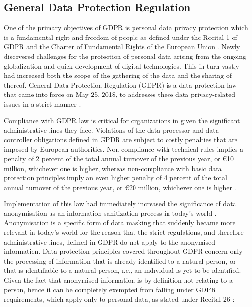 \documentclass[a4paper,twoside,12pt]{book}
\begin{document}
\subsection{General Data Protection Regulation}

One of the primary objectives of GDPR is personal data privacy protection which is a fundamental right and freedom of people as defined under the Recital 1 of GDPR \cite{bib:recital1} and the Charter of Fundamental Rights of the European Union \cite{bib:charter}. Newly discovered challenges for the protection of personal data arising from the ongoing globalization and quick development of digital technologies. This in turn vastly had increased both the scope of the gathering of the data and the sharing of thereof. General Data Protection Regulation (GDPR) is a data protection law that came into force on May 25, 2018, to addresses these data privacy-related issues in a strict manner \cite{bib:recital6}.

Compliance with GDPR law is critical for organizations in given the significant administrative fines they face. Violations of the data processor and data controller obligations defined in GPDR are subject to costly penalties that are imposed by European authorities. Non-compliance with technical rules implies a penalty of 2 percent of the total annual turnover of the previous year, or €10 million, whichever one is higher, whereas non-compliance with basic data protection principles imply an even higher penalty of 4 percent of the total annual turnover of the previous year, or €20 million, whichever one is higher \cite{bib:art83}\cite{bib:gdpr_managing_data_risk}.

Implementation of this law had immediately increased the significance of data anonymisation as an information sanitization process in today's world \cite{bib:anonymization_for_research}. Anonymisation is a specific form of data masking that suddenly became more relevant in today's world for the reason that the strict regulations, and therefore administrative fines, defined in GDPR do not apply to the anonymised information. Data protection principles covered throughout GDPR concern only the processing of information that is already identified to a natural person, or that is identifiable to a natural person, i.e., an individual is yet to be identified. Given the fact that anonymised information is by definition not relating to a person, hence it can be completely exempted from falling under GDPR requirements, which apply only to personal data, as stated under Recital 26 \cite{bib:recital26}:
\end{document}
